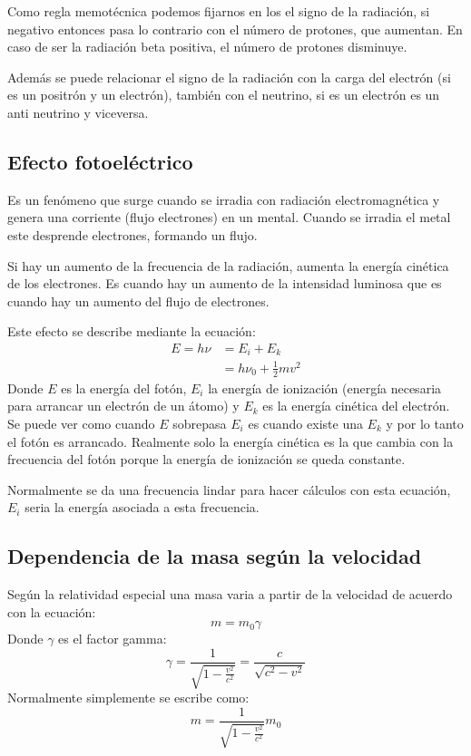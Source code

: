 \documentclass[arial,a4paper,print]{article}
\begin{document}
Como regla memotécnica podemos fijarnos en los el signo de la radiación, si negativo entonces pasa lo contrario con el número de protones, que aumentan. En caso de ser la radiación beta positiva, el número de protones disminuye. 

Además se puede relacionar el signo de la radiación con la carga del electrón (si es un positrón y un electrón), también con el neutrino, si es un electrón es un anti neutrino y viceversa. 

\subsection{Efecto fotoeléctrico}
Es un fenómeno que surge cuando se irradia con radiación electromagnética y genera una corriente (flujo electrones) en un mental. Cuando se irradia el metal este desprende electrones, formando un flujo. 

Si hay un aumento de la frecuencia de la radiación, aumenta la energía cinética de los electrones. Es cuando hay un aumento de la intensidad luminosa que es cuando hay un aumento del flujo de electrones. 

Este efecto se describe mediante la ecuación:
\begin{align*}
	E = h\nu &= E_{i} + E_{k} \\
	&= h\nu_0 + \frac12mv^2 
\end{align*}
Donde $E$ es la energía del fotón, $E_{i}$ la energía de ionización (energía necesaria para arrancar un electrón de un átomo) y $E_{k}$ es la energía cinética del electrón. Se puede ver como cuando $E$ sobrepasa $E_{i}$ es cuando existe una $E_{k}$ y por lo tanto el fotón es arrancado. Realmente solo la energía cinética es la que cambia con la frecuencia del fotón porque la energía de ionización se queda constante. 

Normalmente se da una frecuencia lindar para hacer cálculos con esta ecuación, $E_{i}$ seria la energía asociada a esta frecuencia. 

\subsection{Dependencia de la masa según la velocidad}
Según la relatividad especial una masa varia a partir de la velocidad de acuerdo con la ecuación:
\begin{equation*}
	m=m_{0}\gamma
\end{equation*}
Donde $\gamma$ es el factor gamma:
\begin{equation*}
	\gamma = \frac{1}{\sqrt{1-\frac{v^2}{c^{2}}}} = \frac{c}{\sqrt{c^{2} - v^2}}
\end{equation*}
Normalmente simplemente se escribe como:
\begin{equation*}
	m=\frac{1}{\sqrt{1-\frac{v^2}{c^{2}}}}m_{0}
\end{equation*}
\end{document}
